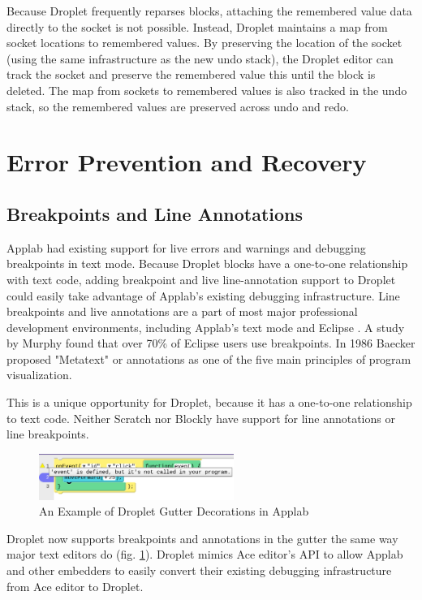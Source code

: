\documentclass[conference]{IEEEtran}
\begin{document}
Because Droplet frequently reparses blocks, attaching the remembered value data directly to the socket is not possible. Instead, Droplet maintains a map from socket locations to remembered values. By preserving the location of the socket (using the same infrastructure as the new undo stack), the Droplet editor can track the socket and preserve the remembered value this until the block is deleted. The map from sockets to remembered values is also tracked in the undo stack, so the remembered values are preserved across undo and redo.

\section{Error Prevention and Recovery}

\subsection{Breakpoints and Line Annotations}

Applab had existing support for live errors and warnings and debugging breakpoints in text mode. Because Droplet blocks have a one-to-one relationship with text code, adding breakpoint and live line-annotation support to Droplet could easily take advantage of Applab's existing debugging infrastructure. Line breakpoints and live annotations are a part of most major professional development environments, including Applab's text mode and Eclipse \cite{Eclipse}. A study by Murphy \cite{Murphy} found that over 70\% of Eclipse users use breakpoints. In 1986 Baecker \cite{Baecker} proposed "Metatext" or annotations as one of the five main principles of program visualization.

This is a unique opportunity for Droplet, because it has a one-to-one relationship to text code. Neither Scratch nor Blockly have support for line annotations or line breakpoints.

\begin{figure}
\centering
\includegraphics[width=2.5in]{breakpoint_annotations.png}
\caption{An Example of Droplet Gutter Decorations in Applab}
\label{breakpoints}
\end{figure}

Droplet now supports breakpoints and annotations in the gutter the same way major text editors do (fig. \ref{breakpoints}). Droplet mimics Ace editor's API to allow Applab and other embedders to easily convert their existing debugging infrastructure from Ace editor to Droplet.
\end{document}
